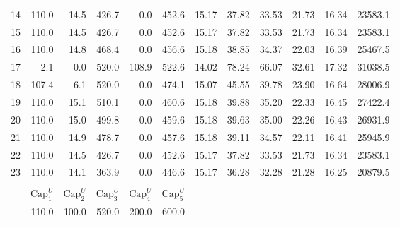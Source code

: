 \documentclass[12pt]{article}
\begin{document}
\begin{table}[h]
\begin{minipage}{\textwidth}
\begin{tabular}{crrrrrrrrrrr}
14	&	110.0	&	14.5	&	426.7	&	0.0	&	452.6	&	15.17	&	37.82	&	33.53	&	21.73	&	16.34	&	23583.1	\\
15	&	110.0	&	14.5	&	426.7	&	0.0	&	452.6	&	15.17	&	37.82	&	33.53	&	21.73	&	16.34	&	23583.1	\\
16	&	110.0	&	14.8	&	468.4	&	0.0	&	456.6	&	15.18	&	38.85	&	34.37	&	22.03	&	16.39	&	25467.5	\\
17	&	2.1	&	0.0	&	520.0	&	108.9	&	522.6	&	14.02	&	78.24	&	66.07	&	32.61	&	17.32	&	31038.5	\\
18	&	107.4	&	6.1	&	520.0	&	0.0	&	474.1	&	15.07	&	45.55	&	39.78	&	23.90	&	16.64	&	28006.9	\\
19	&	110.0	&	15.1	&	510.1	&	0.0	&	460.6	&	15.18	&	39.88	&	35.20	&	22.33	&	16.45	&	27422.4	\\
20	&	110.0	&	15.0	&	499.8	&	0.0	&	459.6	&	15.18	&	39.63	&	35.00	&	22.26	&	16.43	&	26931.9	\\
21	&	110.0	&	14.9	&	478.7	&	0.0	&	457.6	&	15.18	&	39.11	&	34.57	&	22.11	&	16.41	&	25945.9	\\
22	&	110.0	&	14.5	&	426.7	&	0.0	&	452.6	&	15.17	&	37.82	&	33.53	&	21.73	&	16.34	&	23583.1	\\
23	&	110.0	&	14.1	&	363.9	&	0.0	&	446.6	&	15.17	&	36.28	&	32.28	&	21.28	&	16.25	&	20879.5	\\

\hline \\[0.05ex]
& $\mbox{Cap}_1^U$ & $\mbox{Cap}_2^U$ & $\mbox{Cap}_3^U$ & $\mbox{Cap}_4^U$ & $\mbox{Cap}_5^U$  \\
&	110.0	&	100.0	&	520.0	&	200.0	&	600.0	\\
\hline
\end{tabular}
\end{minipage}
\end{table}
\end{document}
